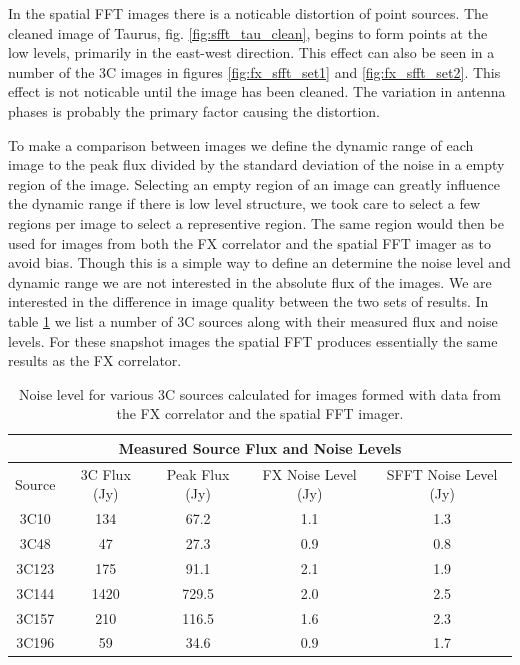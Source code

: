 \documentclass[useAMS,macros,usenatbib,onecolumn]{mn2e}
\begin{document}
In the spatial FFT images there is a noticable distortion of point sources. The cleaned image of Taurus, fig. \ref{fig:sfft_tau_clean}, begins to form points at the low levels, primarily in the east-west direction.
This effect can also be seen in a number of the 3C images in figures \ref{fig:fx_sfft_set1} and \ref{fig:fx_sfft_set2}.
This effect is not noticable until the image has been cleaned.
The variation in antenna phases is probably the primary factor causing the distortion.

To make a comparison between images we define the dynamic range of each image to the peak flux divided by the standard deviation of the noise in a empty region of the image.
Selecting an empty region of an image can greatly influence the dynamic range if there is low level structure, we took care to select a few regions per image to select a representive region.
The same region would then be used for images from both the FX correlator and the spatial FFT imager as to avoid bias.
Though this is a simple way to define an determine the noise level and dynamic range we are not interested in the absolute flux of the images.
We are interested in the difference in image quality between the two sets of results.
In table \ref{tbl:src_flux} we list a number of 3C sources along with their measured flux and noise levels.
For these snapshot images the spatial FFT produces essentially the same results as the FX correlator.

\begin{table}
\begin{center}
\begin{tabular}{|c||c|c|c|c|}
\multicolumn{5}{|c|}{Measured Source Flux and Noise Levels}\\
\hline
Source & 3C Flux (Jy) & Peak Flux (Jy) & FX Noise Level (Jy) & SFFT Noise Level (Jy) \\ \hline
    3C10  &   134 &  67.2 & 1.1 & 1.3 \\
    3C48  &    47 &  27.3 & 0.9 & 0.8 \\
    3C123 &   175 &  91.1 & 2.1 & 1.9 \\
    3C144 &  1420 & 729.5 & 2.0 & 2.5 \\
    3C157 &   210 & 116.5 & 1.6 & 2.3 \\
    3C196 &    59 &  34.6 & 0.9 & 1.7 \\ \hline
\end{tabular}
\caption{Noise level for various 3C sources calculated for images formed with data from the FX correlator and the spatial FFT imager.}
\label{tbl:src_flux}
\end{center}
\end{table}
\end{document}
